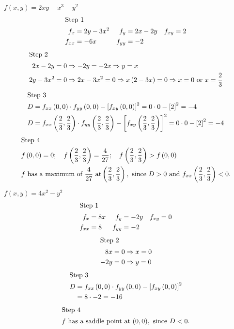 \documentclass[12pt]{article}
\newenvironment{problem}[2][]{
    \begin{trivlist}
        \item[
            {\bfseries #1}
            {\bfseries #2.}
        ]
}{\end{trivlist}}
\begin{document}
\begin{problem}{3}
    $f(x, y) = 2xy - x^3 - y^2$
    \begin{align*}
        \shortintertext{Step 1}
        f_x &= 2y - 3x^2 & f_y &= 2x - 2y & f_{xy} &= 2 \\
        f_{xx} &= -6x & f_{yy} &= -2
    \end{align*}
    \begin{align}
        \shortintertext{Step 2}
        2x - 2y &= 0 \Rightarrow -2y = -2x \Rightarrow y = x \\
        2y - 3x^2 &= 0 \Rightarrow 2x - 3x^2 = 0 \Rightarrow x \left(2 - 3x\right) = 0 \Rightarrow x = 0 \text{ or } x = \frac{2}{3}
    \end{align}
    \begin{align}
        \shortintertext{Step 3}
        D &= f_{xx} \left(0, 0\right) \cdot f_{yy} \left(0, 0\right) - \left[f_{xy} \left(0, 0\right)\right]^2 = 0 \cdot 0 - \left[2\right]^2 = -4 \\
        D &= f_{xx} \left(\frac{2}{3}, \frac{2}{3}\right) \cdot f_{yy} \left(\frac{2}{3}, \frac{2}{3}\right) - \left[f_{xy} \left(\frac{2}{3}, \frac{2}{3}\right)\right]^2 = 0 \cdot 0 - \left[2\right]^2 = -4 
    \end{align}
    \begin{align}
        \shortintertext{Step 4}
        &f\left(0, 0\right) = 0; \quad f\left(\frac{2}{3},\frac{2}{3}\right) = \frac{4}{27}; \quad f\left(\frac{2}{3},\frac{2}{3}\right) > f\left(0, 0\right) \\
        &f \text{ has a maximum of } \frac{4}{27} \text{ at} \left(\frac{2}{3},\frac{2}{3}\right), \text{ since } D > 0 \text{ and } f_{xx} \left(\frac{2}{3},\frac{2}{3}\right) < 0.
    \end{align}
\end{problem}

\begin{problem}{11}
    $f(x, y) = 4x^2 - y^2$
    \begin{align*}
        \shortintertext{Step 1}
        f_x &= 8x & f_y &= -2y & f_{xy} &= 0 \\
        f_{xx} &= 8 & f_{yy} &= -2
    \end{align*}
    \begin{align}
        \shortintertext{Step 2}
        8x &= 0 \Rightarrow x = 0 \\
        -2y &= 0 \Rightarrow y = 0 
    \end{align}
    \begin{align}
        \shortintertext{Step 3}
        D &= f_{xx} \left(0, 0\right) \cdot f_{yy} \left(0, 0\right) - \left[f_{xy} \left(0, 0\right)\right]^2 \\
        &= 8 \cdot -2 = -16
    \end{align}
    \begin{align}
        \shortintertext{Step 4}
        f \text{ has a saddle point at } (0, 0), \text{ since } D < 0.
    \end{align}
\end{problem}
\end{document}
